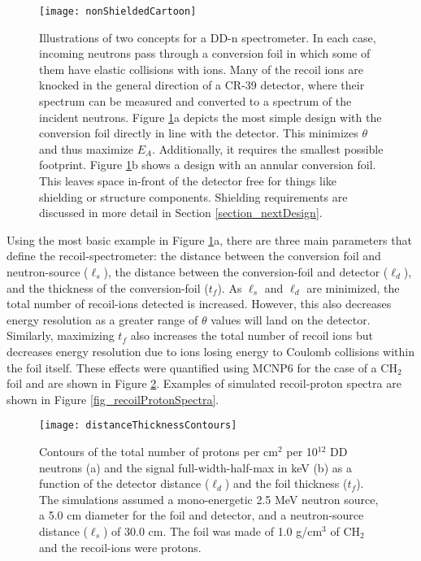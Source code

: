 \begin{figure}[h!]
	
	\centering
	\texttt{[image: nonShieldedCartoon]}
	\caption{Illustrations of two concepts for a DD-n spectrometer. In each case, incoming neutrons pass through a conversion foil in which some of them have elastic collisions with ions. Many of the recoil ions are knocked in the general direction of a CR-39 detector, where their spectrum can be measured and converted to a spectrum of the incident neutrons. Figure \ref{fig_nonShieldedCartoon}a depicts the most simple design with the conversion foil directly in line with the detector. This minimizes $\theta$ and thus maximize $E_A$. Additionally, it requires the smallest possible footprint. Figure \ref{fig_nonShieldedCartoon}b shows a design with an annular conversion foil. This leaves space in-front of the detector free for things like shielding or structure components. Shielding requirements are discussed in more detail in Section \ref{section_nextDesign}. }
	\label{fig_nonShieldedCartoon}
	
\end{figure}

Using the most basic example in Figure \ref{fig_nonShieldedCartoon}a, there are three main parameters that define the recoil-spectrometer: the distance between the conversion foil and neutron-source ($\ell_s$), the distance between the conversion-foil and detector ($\ell_d$), and the thickness of the conversion-foil ($t_{f}$). As $\ell_s$ and $\ell_d$ are minimized, the total number of recoil-ions detected is increased. However, this also decreases energy resolution as a greater range of $\theta$ values will land on the detector. Similarly, maximizing $t_f$ also increases the total number of recoil ions but decreases energy resolution due to ions losing energy to Coulomb collisions within the foil itself. These effects were quantified using MCNP6 \cite{MCNP6} for the case of a CH$_2$ foil and are shown in Figure \ref{fig_distanceThicknessContour}. Examples of simulated recoil-proton spectra are shown in Figure \ref{fig_recoilProtonSpectra}.

\begin{figure}[h!]
	
	\centering
	\texttt{[image: distanceThicknessContours]}
	\caption{Contours of the total number of protons per cm$^2$ per 10$^{12}$ DD neutrons (a) and the signal full-width-half-max in keV (b) as a function of the detector distance ($\ell_d$) and the foil thickness ($t_f$). The simulations assumed a mono-energetic 2.5 MeV neutron source, a 5.0 cm diameter for the foil and detector, and a neutron-source distance ($\ell_s$) of 30.0 cm. The foil was made of 1.0 g/cm$^3$ of CH$_2$ and the recoil-ions were protons.}
	\label{fig_distanceThicknessContour}
	
\end{figure}

